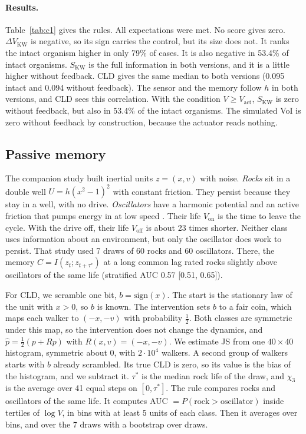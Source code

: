\documentclass[11pt]{article}
\newcommand{\Vact}{V_{\mathrm{act}}}
\newcommand{\DVKW}{\Delta V_{\mathrm{KW}}}
\newcommand{\SKW}{S_{\mathrm{KW}}}
\newcommand{\Von}{V_{\mathrm{on}}}
\newcommand{\Voff}{V_{\mathrm{off}}}
\begin{document}
\paragraph{Results.} Table~\ref{tab:c1} gives the rules. All expectations were met. No score gives zero. $\DVKW$ is
negative, so its sign carries the control, but its size does not. It ranks the intact organism higher in only 79\% of
cases. It is also negative in 53.4\% of intact organisms. $\SKW$ is the full information in both versions, and it is
a little higher without feedback. CLD gives the same median to both versions (0.095 intact and 0.094 without feedback).
The sensor and the memory follow $h$ in both versions, and CLD sees this correlation. With the condition
$V\ge\Vact$, $\SKW$ is zero without feedback, but also in 53.4\% of the intact organisms. The simulated VoI is zero
without feedback by construction, because the actuator reads nothing.

\subsection{Passive memory}
The companion study \cite{Beiro26} built inertial units $z=(x,v)$ with noise. \emph{Rocks} sit in a double well
$U=h(x^2-1)^2$ with constant friction. They persist because they stay in a well, with no drive. \emph{Oscillators}
have a harmonic potential and an active friction that pumps energy in at low speed
\cite{SchweitzerEbelingTilch98,Romanczuk12}. Their life $\Von$ is the time to leave the cycle. With the drive off,
their life $\Voff$ is about 23 times shorter. Neither class uses information about an environment, but only the
oscillator does work to persist. That study used 7 draws of 60 rocks and 60 oscillators. There, the memory
$C=I(z_t;z_{t+\tau^\ast})$ at a long common lag rated rocks slightly above oscillators of the same life (stratified AUC
0.57 [0.51, 0.65]).

For CLD, we scramble one bit, $b=\mathrm{sign}(x)$. The start is the stationary law of the unit with $x>0$, so $b$ is
known. The intervention sets $b$ to a fair coin, which maps each walker to $(-x,-v)$ with probability $\tfrac12$. Both
classes are symmetric under this map, so the intervention does not change the dynamics, and
$\hat p=\tfrac12(p+Rp)$ with $R(x,v)=(-x,-v)$. We estimate JS from one $40\times40$ histogram, symmetric about 0, with
$2\cdot10^4$ walkers. A second group of walkers starts with $b$ already scrambled. Its true CLD is zero, so its value is
the bias of the histogram, and we subtract it. $\tau^\ast$ is the median rock life of the draw, and $\chi_3$ is the
average over 41 equal steps on $[0,\tau^\ast]$. The rule compares rocks and oscillators of the same life. It
computes AUC $=P(\text{rock}>\text{oscillator})$ inside tertiles of $\log V$, in bins with at least 5 units of each
class. Then it averages over bins, and over the 7 draws with a bootstrap over draws.
\end{document}
